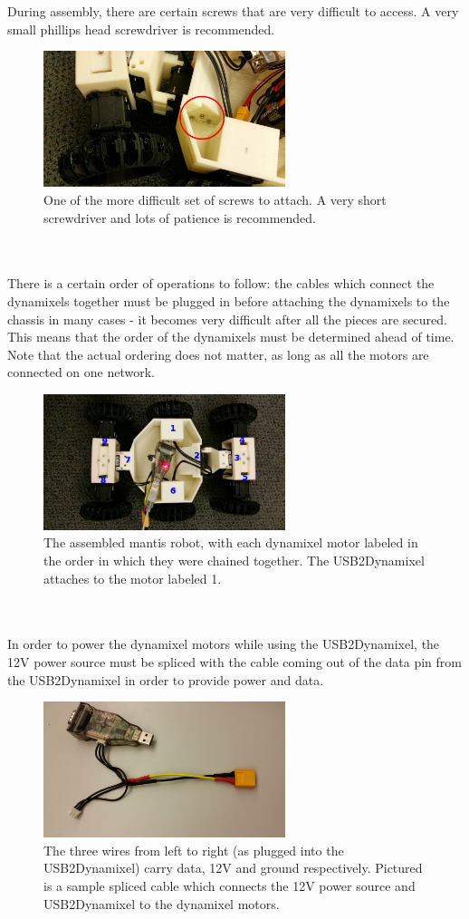 \documentclass[]{article}
\begin{document}
\\
\\
During assembly, there are certain screws that are very difficult to access. A very small phillips head screwdriver is recommended.
\begin{figure}[h]
\centering
\includegraphics[width=200pt]{report_images/difficult_screw.jpg}
\caption{One of the more difficult set of screws to attach. A very short screwdriver and lots of patience is recommended.}
\end{figure}
\\
\\
There is a certain order of operations to follow: the cables which connect the dynamixels together must be plugged in before attaching the dynamixels to the chassis in many cases - it becomes very difficult after all the pieces are secured. This means that the order of the dynamixels must be determined ahead of time. Note that the actual ordering does not matter, as long as all the motors are connected on one network.
\begin{figure}[h]
\centering
\includegraphics[width=200pt]{report_images/top_down.jpg}
\caption{The assembled mantis robot, with each dynamixel motor labeled in the order in which they were chained together. The USB2Dynamixel attaches to the motor labeled 1.}
\end{figure}
\\
\\
In order to power the dynamixel motors while using the USB2Dynamixel, the 12V power source must be spliced with the cable coming out of the data pin from the USB2Dynamixel in order to provide power and data.
\begin{figure}[h]
\centering
\includegraphics[width=200pt]{report_images/splice.jpg}
\caption{The three wires from left to right (as plugged into the USB2Dynamixel) carry data, 12V and ground respectively. Pictured is a sample spliced cable which connects the 12V power source and USB2Dynamixel to the dynamixel motors.}
\end{figure}
\end{document}

